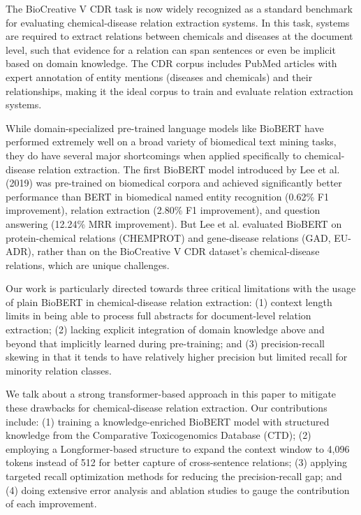 \documentclass{amia}
\begin{document}
The BioCreative V CDR task is now widely recognized as a standard benchmark for evaluating chemical-disease relation extraction systems. In this task, systems are required to extract relations between chemicals and diseases at the document level, such that evidence for a relation can span sentences or even be implicit based on domain knowledge. The CDR corpus includes PubMed articles with expert annotation of entity mentions (diseases and chemicals) and their relationships, making it the ideal corpus to train and evaluate relation extraction systems.

While domain-specialized pre-trained language models like BioBERT have performed extremely well on a broad variety of biomedical text mining tasks, they do have several major shortcomings when applied specifically to chemical-disease relation extraction. The first BioBERT model introduced by Lee et al. (2019) was pre-trained on biomedical corpora and achieved significantly better performance than BERT in biomedical named entity recognition (0.62\% F1 improvement), relation extraction (2.80\% F1 improvement), and question answering (12.24\% MRR improvement). But Lee et al. evaluated BioBERT on protein-chemical relations (CHEMPROT) and gene-disease relations (GAD, EU-ADR), rather than on the BioCreative V CDR dataset's chemical-disease relations, which are unique challenges.

Our work is particularly directed towards three critical limitations with the usage of plain BioBERT in chemical-disease relation extraction: (1) context length limits in being able to process full abstracts for document-level relation extraction; (2) lacking explicit integration of domain knowledge above and beyond that implicitly learned during pre-training; and (3) precision-recall skewing in that it tends to have relatively higher precision but limited recall for minority relation classes.

We talk about a strong transformer-based approach in this paper to mitigate these drawbacks for chemical-disease relation extraction. Our contributions include: (1) training a knowledge-enriched BioBERT model with structured knowledge from the Comparative Toxicogenomics Database (CTD); (2) employing a Longformer-based structure to expand the context window to 4,096 tokens instead of 512 for better capture of cross-sentence relations; (3) applying targeted recall optimization methods for reducing the precision-recall gap; and (4) doing extensive error analysis and ablation studies to gauge the contribution of each improvement.
\end{document}
